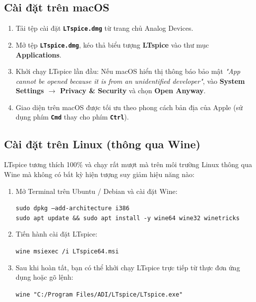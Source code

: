 \documentclass[11pt,a4paper]{article}
\newcommand{\code}[1]{\texttt{\color{navy}\textbf{#1}}}
\newcommand{\key}[1]{\colorbox{gray!20}{\texttt{\textbf{#1}}}}
\begin{document}
\subsection{Cài đặt trên macOS}
\begin{enumerate}[itemsep=2pt]
  \item Tải tệp cài đặt \code{LTspice.dmg} từ trang chủ Analog Devices.
  \item Mở tệp \code{LTspice.dmg}, kéo thả biểu tượng \textbf{LTspice} vào thư mục \textbf{Applications}.
  \item Khởi chạy LTspice lần đầu: Nếu macOS hiển thị thông báo bảo mật \textit{"App cannot be opened because it is from an unidentified developer"}, vào \textbf{System Settings $\rightarrow$ Privacy \& Security} và chọn \textbf{Open Anyway}.
  \item Giao diện trên macOS được tối ưu theo phong cách bản địa của Apple (sử dụng phím \key{Cmd} thay cho phím \key{Ctrl}).
\end{enumerate}

\subsection{Cài đặt trên Linux (thông qua Wine)}
LTspice tương thích 100\% và chạy rất mượt mà trên môi trường Linux thông qua Wine mà không có bất kỳ hiện tượng suy giảm hiệu năng nào:
\begin{enumerate}[itemsep=2pt]
  \item Mở Terminal trên Ubuntu / Debian và cài đặt Wine:
\begin{tcolorbox}[colback=codebg,colframe=bordergray,arc=2pt,boxrule=0.8pt]
\small\texttt{sudo dpkg --add-architecture i386}\\
\texttt{sudo apt update \&\& sudo apt install -y wine64 wine32 winetricks}
\end{tcolorbox}
  \item Tiến hành cài đặt LTspice:
\begin{tcolorbox}[colback=codebg,colframe=bordergray,arc=2pt,boxrule=0.8pt]
\small\texttt{wine msiexec /i LTspice64.msi}
\end{tcolorbox}
  \item Sau khi hoàn tất, bạn có thể khởi chạy LTspice trực tiếp từ thực đơn ứng dụng hoặc gõ lệnh:
\begin{tcolorbox}[colback=codebg,colframe=bordergray,arc=2pt,boxrule=0.8pt]
\small\texttt{wine "C:/Program Files/ADI/LTspice/LTspice.exe"}
\end{tcolorbox}
\end{enumerate}
\end{document}
